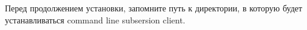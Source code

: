\documentclass[a4paper,12pt]{article}
\begin{document}
Перед продолжением установки, запомните путь к директории, в которую
будет устанавливаться command line subsersion client.

\begin{figure}[h!]
	\begin{minipage}[h]{0.49\linewidth}
	\end{minipage}
	\hfill
	\begin{minipage}[h]{0.49\linewidth}
\end{minipage}
\end{figure}
\end{document}

